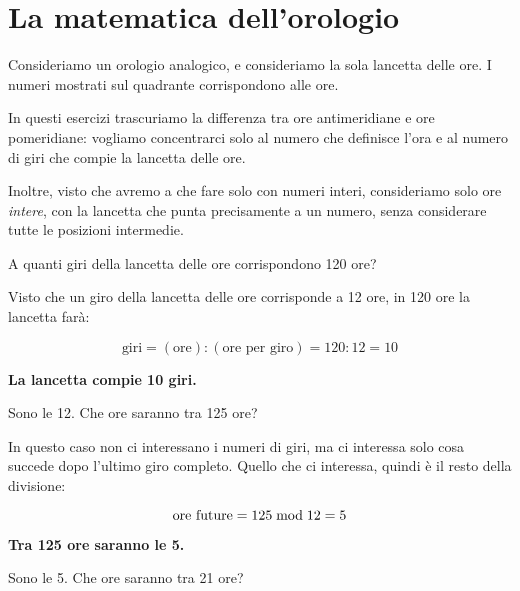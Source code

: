 \chapter{La matematica dell'orologio}
\label{ch:matematica_orologio}

Consideriamo un orologio analogico, e consideriamo la sola lancetta delle ore.
I numeri mostrati sul quadrante corrispondono alle ore.

In questi esercizi trascuriamo la differenza tra ore antimeridiane e ore pomeridiane: vogliamo concentrarci solo al
numero che definisce l'ora e al numero di giri che compie la lancetta delle ore.

Inoltre, visto che avremo a che fare solo con numeri interi, consideriamo solo ore \emph{intere}, con la lancetta che
punta precisamente a un numero, senza considerare tutte le posizioni intermedie.

\begin{esercizio}
    A quanti giri della lancetta delle ore corrispondono 120 ore?
\end{esercizio}

\begin{soluzionenonum}
    Visto che un giro della lancetta delle ore corrisponde a 12 ore, in 120 ore la lancetta farà:

    \begin{equation*}
        \text{giri} = (\text{ore}) : (\text{ore per giro}) = 120 : 12 = 10
    \end{equation*}

    \textbf{La lancetta compie 10 giri.}
\end{soluzionenonum}

\newpage
\begin{esercizio}
    Sono le 12.
    Che ore saranno tra 125 ore?
\end{esercizio}
\begin{soluzionenonum}
    In questo caso non ci interessano i numeri di giri, ma ci interessa solo cosa succede dopo l'ultimo giro completo.
    Quello che ci interessa, quindi è il resto della divisione:

    \begin{equation*}
        \text{ore future} = 125  \bmod  12 = 5
    \end{equation*}

    \textbf{Tra 125 ore saranno le 5.}
\end{soluzionenonum}

\begin{esercizio}
    Sono le 5.
    Che ore saranno tra 21 ore?
\end{esercizio}

